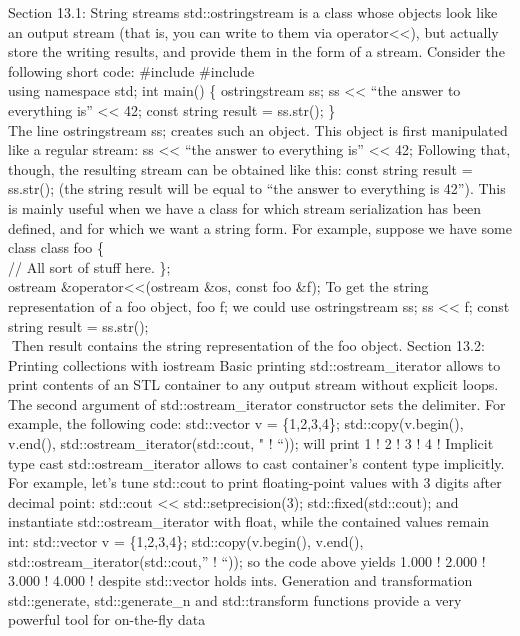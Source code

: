 Section 13.1: String streams std::ostringstream is a class whose objects
look like an output stream (that is, you can write to them via
operator\textless\textless), but actually store the writing results, and
provide them in the form of a stream. Consider the following short code:
\#include \#include \\
using namespace std; int main() \{ ostringstream ss; ss
\textless\textless{} ``the answer to everything is''
\textless\textless{} 42; const string result = ss.str(); \}\\
The line ostringstream ss; creates such an object. This object is ﬁrst
manipulated like a regular stream: ss \textless\textless{} ``the answer
to everything is'' \textless\textless{} 42; Following that, though, the
resulting stream can be obtained like this: const string result =
ss.str(); (the string result will be equal to ``the answer to everything
is 42''). This is mainly useful when we have a class for which stream
serialization has been deﬁned, and for which we want a string form. For
example, suppose we have some class class foo \{\\
// All sort of stuff here. \};\\
ostream \&operator\textless\textless(ostream \&os, const foo \&f); To
get the string representation of a foo object, foo f; we could use
ostringstream ss; ss \textless\textless{} f; const string result =
ss.str();\\
Then result contains the string representation of the foo object.
Section 13.2: Printing collections with iostream Basic printing
std::ostream\_iterator allows to print contents of an STL container to
any output stream without explicit loops. The second argument of
std::ostream\_iterator constructor sets the delimiter. For example, the
following code: std::vector v = \{1,2,3,4\}; std::copy(v.begin(),
v.end(), std::ostream\_iterator(std::cout, " ! ``)); will print 1 ! 2 !
3 ! 4 ! Implicit type cast std::ostream\_iterator allows to cast
container's content type implicitly. For example, let's tune std::cout
to print ﬂoating-point values with 3 digits after decimal point:
std::cout \textless\textless{} std::setprecision(3);
std::fixed(std::cout); and instantiate std::ostream\_iterator with
float, while the contained values remain int: std::vector v =
\{1,2,3,4\}; std::copy(v.begin(), v.end(),
std::ostream\_iterator(std::cout,'' ! ``)); so the code above yields
1.000 ! 2.000 ! 3.000 ! 4.000 ! despite std::vector holds ints.
Generation and transformation std::generate, std::generate\_n and
std::transform functions provide a very powerful tool for on-the-ﬂy data
